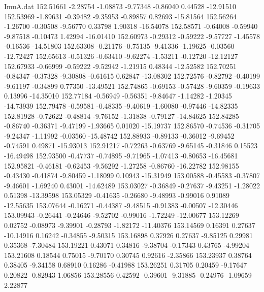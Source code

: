 \begin{filecontents}{ImuA.dat}
 152.51661   -2.28754   -1.08873   -9.77348   -0.86040    0.44528  -12.91510
 152.53969   -1.89631   -0.39482   -9.35953   -0.89857    0.82693  -15.81564
 152.56264   -1.26700   -0.30508   -9.56770    0.33798    1.90318  -16.54078
 152.58571   -0.64008   -0.59940   -9.87518   -0.10473    1.42994  -16.01410
 152.60973   -0.29312   -0.59222   -9.57727   -1.45578   -0.16536  -14.51803
 152.63308   -0.21176   -0.75135   -9.41336   -1.19625   -0.03560  -12.72427
 152.65613   -0.51326   -0.63410   -9.62274   -1.53211   -0.12720  -12.12127
 152.67933   -0.66999   -0.59222   -9.52942   -1.21915    0.48344  -12.52582
 152.70251   -0.84347   -0.37328   -9.30808   -0.61615    0.62847  -13.08302
 152.72576   -0.82792   -0.40199   -9.61197   -0.34899    0.77350  -13.49521
 152.74865   -0.69153   -0.57428   -9.60359   -0.19633    0.13996  -14.35010
 152.77184   -0.56949   -0.56351   -9.84647   -1.14282   -1.20345  -14.73939
 152.79478   -0.59581   -0.48335   -9.40619   -1.60080   -0.97446  -14.82335
 152.81928   -0.72622   -0.48814   -9.76152   -1.31838   -0.79127  -14.84625
 152.84285   -0.86740   -0.36371   -9.47199   -1.93665    0.01020  -15.19737
 152.86570   -0.74536   -0.31705   -9.24347   -1.11992   -0.03560  -15.48742
 152.88933   -0.89133   -0.36012   -9.69452   -0.74591    0.49871  -15.93013
 152.91217   -0.72263   -0.63769   -9.65145   -0.31846    0.15523  -16.49498
 152.93500   -0.47737   -0.74895   -9.71965   -1.07413   -0.80653  -16.45681
 152.95821   -0.46181   -0.62453   -9.56292   -1.27258   -0.86760  -16.22782
 152.98155   -0.43430   -0.41874   -9.80459   -1.18099    0.10943  -15.31949
 153.00588   -0.45583   -0.37807   -9.46601   -1.69240    0.43001  -14.62489
 153.03027   -0.36849   -0.27637   -9.43251   -1.28022    0.51398  -13.39598
 153.05329   -0.41635   -0.26680   -9.48993   -0.99016    0.91089  -12.55635
 153.07644   -0.16271   -0.44387   -9.48515   -0.91383   -0.00507  -12.30446
 153.09943   -0.26441   -0.24646   -9.52702   -0.99016   -1.72249  -12.00677
 153.12269    0.02752   -0.08973   -9.39901   -0.28793   -1.82172  -11.40376
 153.14569    0.16391    0.27637  -10.14916    0.16242   -0.34855   -9.50315
 153.16898    0.37926    0.27637   -9.85125    0.29981    0.35368   -7.30484
 153.19221    0.43071    0.34816   -9.38704   -0.17343    0.43765   -4.99204
 153.21608    0.18544    0.75015   -9.70170    0.30745    0.92616   -2.35866
 153.23937    0.38764    0.38405   -9.34158    0.68910    0.16286   -0.41988
 153.26251    0.31705    0.20459   -9.17647    0.20822   -0.82943    1.06856
 153.28556    0.42592   -0.39601   -9.31885   -0.24976   -1.09659    2.22877

\end{filecontents}
